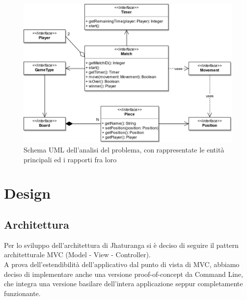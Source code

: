 \documentclass[a4paper,12pt]{report}
\begin{document}
\begin{figure}[H]
    \begin{center}
        \centering
        \includegraphics[width=\textwidth]{img/uml/analysis.png}
    \end{center}
    \caption{Schema UML dell'analisi del problema, con rappresentate le entità principali ed i rapporti fra loro}
    \label{img:analysis1}
\end{figure}

\chapter{Design}

\section{Architettura}

Per lo sviluppo dell'architettura di Jhaturanga si è deciso di seguire il pattern architetturale MVC (Model - View - Controller).
\\
A prova dell'estendibilità dell'applicativo dal punto di vista di MVC, abbiamo deciso di implementare anche una versione proof-of-concept da Command Line, che integra una versione basilare dell'intera applicazione seppur completamente funzionante.
\end{document}

